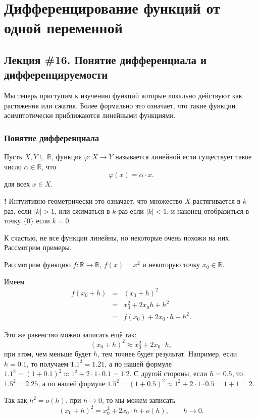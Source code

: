 \chapter{Дифференцирование функций от одной переменной}

\section{Лекция \#16. Понятие дифференциала и дифференцируемости}

Мы теперь приступим к изучению функций которые локально действуют как растяжения или сжатия. Более формально это означает, что такие функции асимптотически приближаются линейными функциями.

\subsection{Понятие дифференциала}


\begin{definition}
Пусть $X,Y \subseteq \mathbb{R}$, функция $\varphi:X \to Y$ называется линейной если существует такое число $\alpha \in \mathbb{R}$, что
  \[
  \varphi(x) = \alpha \cdot x.
  \]
  для всех $x \in X.$
\end{definition}

\begin{mydanger}{\bf !}
  Интуитивно-геометрически это означает, что множество $X$ растягивается в $k$ раз, если $|k| >1$, или сжиматься в $k$ раз если $|k|<1$, и наконец отобразиться в точку $\{0\}$ если $k = 0.$
\end{mydanger}

К счастью, не все функции линейны, но некоторые очень похожи на них. Рассмотрим примеры.

\begin{example}
Рассмотрим функцию $f:\mathbb{R} \to \mathbb{R}$, $f(x) = x^2$ и некоторую точку $x_0\in \mathbb{R}$.

Имеем
 \begin{eqnarray*}
   f(x_0+h) &=& (x_0+h)^2 \\
    &=& x_0^2 + 2x_0h + h^2\\
    &=& f(x_0) + 2x_0\cdot h + h^2.
 \end{eqnarray*}

Это же равенство можно записать ещё так:
\[
 (x_0+h)^2 \approx x_0^2 + 2x_0\cdot h,
\]
при этом, чем меньше будет $h$, тем точнее будет результат. Например, если $h=0.1$, то получаем $1.1^2 =1.21$, а по нашей формуле $1.1^2 = (1+0.1)^2 \approx 1^2+ 2\cdot 1 \cdot 0.1 = 1.2$. С другой стороны, если $h=0.5$, то $1.5^2 = 2.25$, а по нашей формуле $1.5^2 = (1+0.5)^2 \approx 1^2 + 2\cdot 1 \cdot 0.5 = 1 + 1 = 2.$

Так как $h^2 = o(h)$, при $h\to 0$, то мы можем записать 
\[
 (x_0+h)^2 = x_0^2 + 2x_0\cdot h + o(h), \qquad h \to 0.
\]
\end{example}

